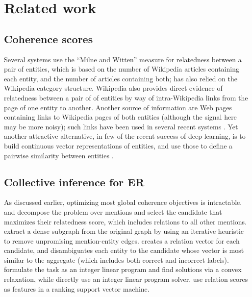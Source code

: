 \section{Related work}
\label{sec:related}

\subsection{Coherence scores}

Several systems \cite{Milne2008,KulkarniSRC09,Hoffart2011} use the ``Milne and Witten'' measure for relatedness between a pair of entities, which is based on the number of Wikipedia articles containing each entity, and the number of articles containing both;  has also relied on the Wikipedia category structure. %
Wikipedia also provides direct evidence of relatedness between a pair of of entities by way of intra-Wikipedia links from the page of one entity to another. Another source of information are Web pages containing links to Wikipedia pages of both entities (although the signal here may be more noisy); such links have been used in several recent systems \cite{ChengR13,Chisholm2015}.  Yet another attractive alternative, in few of the recent success of deep learning, is to build continuous vector representations of entities, and use those to define a pairwise similarity between entities \cite{YamadaS0T16}.


\subsection{Collective inference for ER}

As discussed earlier, optimizing most global coherence objectives is intractable.  and  decompose the problem over mentions and select the candidate that maximizes their relatedness score, which includes relations to all other mentions. %
 extract a dense subgraph from the original graph by using an iterative heuristic to remove unpromising mention-entity edges.  creates a relation vector for each candidate, and disambiguates each entity to the candidate whose vector is most similar to the aggregate (which includes both correct and incorrect labels).  formulate the task as an integer linear program and find solutions via a convex relaxation, while  directly use an integer linear program solver. 
 use relation scores as features in a ranking support vector machine. 

